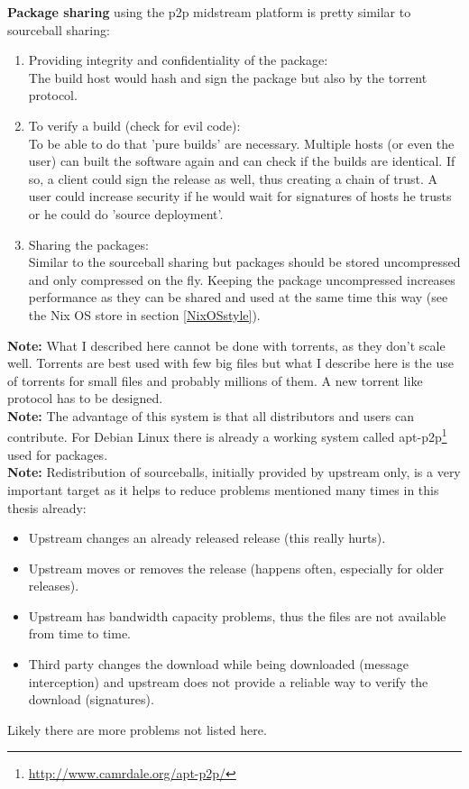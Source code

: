 \documentclass[a4paper,10pt]{article}
\begin{document}
\textbf{Package sharing} using the p2p midstream platform is pretty similar to sourceball sharing:
\begin{enumerate}
  \item Providing integrity and confidentiality of the package:\\
  The build host would hash and sign the package but also by the torrent protocol.
    
  \item To verify a build (check for evil code): \\
  To be able to do that 'pure builds' are necessary. Multiple hosts (or even the user) can built the software again and can check if the builds are identical. If so, a client could sign the release as well, thus creating a chain of trust. A user could increase security if he would wait for signatures of hosts he trusts or he could do 'source deployment'.

  \item Sharing the packages: \\
  Similar to the sourceball sharing but packages should be stored uncompressed and only compressed on the fly. Keeping the package uncompressed increases performance as they can be shared and used at the same time this way (see the Nix OS store in section \ref{NixOSstyle}).
\end{enumerate}

 


\textbf{Note:} What I described here cannot be done with torrents, as they don't scale well. Torrents are best used with few big files but what I describe here is the use of torrents for small files and probably millions of them. A new torrent like protocol has to be designed.\\

\textbf{Note:} The advantage of this system is that all distributors and users can contribute. For Debian Linux there is already a working system called apt-p2p\footnote{\url{http://www.camrdale.org/apt-p2p/}} used for packages.\\

\textbf{Note:} Redistribution of sourceballs, initially provided by upstream only, is a very important target as it helps to reduce problems mentioned many times in this thesis already: 
\begin{itemize}
\item Upstream changes an already released release (this really hurts).
\item Upstream moves or removes the release (happens often, especially for older releases).
\item Upstream has bandwidth capacity problems, thus the files are not available from time to time.
\item Third party changes the download while being downloaded (message interception) and upstream does not provide a reliable way to verify the download (signatures).
\end{itemize}
Likely there are more problems not listed here.
\end{document}
